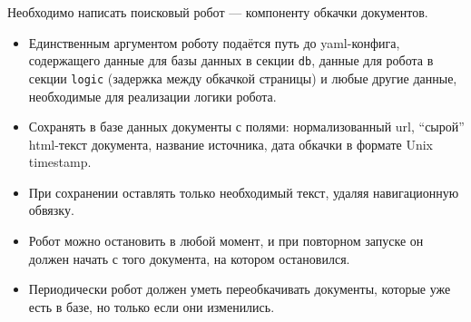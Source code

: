 
Необходимо написать поисковый робот --- компоненту обкачки документов.

\begin{itemize}
    \item Единственным аргументом роботу подаётся путь до yaml-конфига,
          содержащего данные для базы данных в секции \texttt{db}, данные для
          робота в секции \texttt{logic} (задержка между обкачкой страницы) и
          любые другие данные, необходимые для реализации логики робота.
    \item Сохранять в базе данных документы с полями: нормализованный url,
          \enquote{сырой} html-текст документа, название источника, дата
          обкачки в формате Unix timestamp.
    \item При сохранении оставлять только необходимый текст, удаляя
          навигационную обвязку.
    \item Робот можно остановить в любой момент, и при повторном запуске он
          должен начать с того документа, на котором остановился.
    \item Периодически робот должен уметь переобкачивать документы, которые уже
          есть в базе, но только если они изменились.
\end{itemize}

\pagebreak

